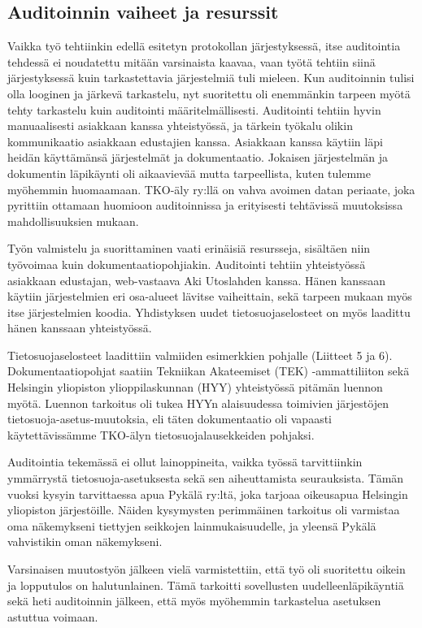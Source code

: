 \documentclass[finnish]{tktltiki}
\begin{document}
\subsection{Auditoinnin vaiheet ja resurssit}

Vaikka työ tehtiinkin edellä esitetyn protokollan järjestyksessä, itse auditointia tehdessä ei noudatettu mitään varsinaista kaavaa, vaan työtä tehtiin siinä järjestyksessä kuin tarkastettavia järjestelmiä tuli mieleen. Kun auditoinnin tulisi olla looginen ja järkevä tarkastelu, nyt suoritettu oli enemmänkin tarpeen myötä tehty tarkastelu kuin auditointi määritelmällisesti.  Auditointi tehtiin hyvin manuaalisesti asiakkaan kanssa yhteistyössä,  ja tärkein työkalu olikin kommunikaatio asiakkaan edustajien kanssa. Asiakkaan kanssa käytiin läpi heidän käyttämänsä järjestelmät ja dokumentaatio. Jokaisen järjestelmän ja dokumentin läpikäynti oli aikaavievää mutta tarpeellista, kuten tulemme myöhemmin huomaamaan. TKO-äly ry:llä on vahva avoimen datan periaate, joka pyrittiin ottamaan huomioon auditoinnissa ja erityisesti tehtävissä muutoksissa mahdollisuuksien mukaan.

Työn valmistelu ja suorittaminen vaati erinäisiä resursseja, sisältäen niin työvoimaa kuin dokumentaatiopohjiakin. Auditointi tehtiin yhteistyössä asiakkaan edustajan, web-vastaava Aki Utoslahden kanssa. Hänen kanssaan käytiin järjestelmien eri osa-alueet lävitse vaiheittain, sekä tarpeen mukaan myös itse järjestelmien koodia. Yhdistyksen uudet tietosuojaselosteet on myös laadittu hänen kanssaan yhteistyössä. 

Tietosuojaselosteet laadittiin valmiiden esimerkkien pohjalle (Liitteet 5 ja 6). Dokumentaatiopohjat saatiin Tekniikan Akateemiset (TEK) -ammattiliiton sekä Helsingin yliopiston ylioppilaskunnan (HYY) yhteistyössä pitämän luennon myötä. Luennon tarkoitus oli tukea HYYn alaisuudessa toimivien järjestöjen tietosuoja-asetus-muutoksia, eli täten dokumentaatio oli vapaasti käytettävissämme TKO-älyn tietosuojalausekkeiden pohjaksi.

Auditointia tekemässä ei ollut lainoppineita, vaikka työssä tarvittiinkin ymmärrystä tietosuoja-asetuksesta sekä sen aiheuttamista seurauksista. Tämän vuoksi kysyin tarvittaessa apua Pykälä ry:ltä, joka tarjoaa oikeusapua Helsingin yliopiston järjestöille. Näiden kysymysten perimmäinen tarkoitus oli varmistaa oma näkemykseni tiettyjen seikkojen lainmukaisuudelle, ja yleensä Pykälä vahvistikin oman näkemykseni.

Varsinaisen muutostyön jälkeen vielä varmistettiin, että työ oli suoritettu oikein ja lopputulos on halutunlainen. Tämä tarkoitti sovellusten uudelleenläpikäyntiä sekä heti auditoinnin jälkeen, että myös myöhemmin tarkastelua asetuksen astuttua voimaan.
\end{document}
